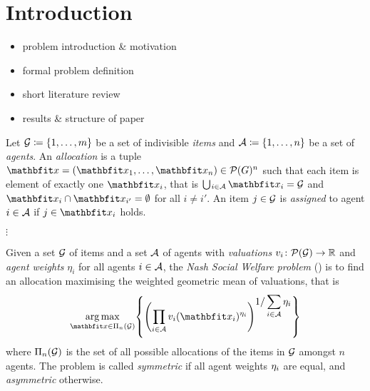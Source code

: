 \section{Introduction}
\label{sec:intro}

\begin{itemize}
	\item
	problem introduction \& motivation

	\item
	formal problem definition

	\item
	short literature review

	\item
	results \& structure of paper
\end{itemize}

\begin{definition}
	Let \(\mathcal{G} \coloneq \{1, \dots, m\}\) be a set of indivisible \emph{items} and \(\mathcal{A} \coloneq \{1, \dots, n\}\) be a set of \emph{agents}.
	An \emph{allocation} is a tuple \(\alloc = ( \alloc[1], \dots, \alloc[n] ) \in \powerset[G]^n\) such that each item is element of exactly one \(\alloc[i]\), that is \(\mathop{\bigcup\hspace{-1pt}_{i \in \agents}} \alloc[i] = \goods\) and \(\alloc[i] \cap \alloc[i'] = \emptyset\) for all \(i \neq i'\).
	An item \(j \in \mathcal{G}\) is \emph{assigned} to agent \(i \in \mathcal{A}\) if \(j \in \alloc[i]\) holds.
\end{definition}

\(\vdots\)

\begin{definition}
	Given a set \(\mathcal{G}\) of items and a set \(\mathcal{A}\) of agents with \emph{valuations} \(\valuations[i] \colon \powerset[\goods] \to \real\) and \emph{agent weights} \(\eta_i\) for all agents \(i \in \mathcal{A}\), the \emph{Nash Social Welfare problem} (\NSW) is to find an allocation maximising the weighted geometric mean of valuations, that is
	\begin{equation*}
		\argmax_{\alloc \in \allallocs{n}{\goods}} \left\{ \left( \prod_{i \in \agents} \valuations[i][\alloc[i]]^{\weight{i}} \right)^{\displaystyle 1 / \sum_{i \in \agents} \weight{i}} \right\}
	\end{equation*}
	where \(\Pi_{n}(\mathcal{G})\) is the set of all possible allocations of the items in \(\mathcal{G}\) amongst \(n\) agents.
	The problem is called \emph{symmetric} if all agent weights \(\eta_{i}\) are equal, and \emph{asymmetric} otherwise.
\end{definition}

